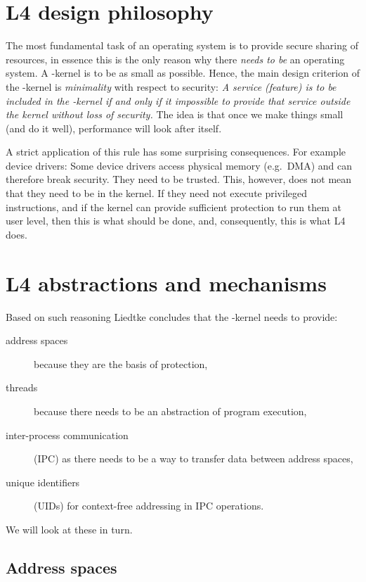 \section{L4 design philosophy}

The most fundamental task of an operating system is to provide secure
sharing of resources, in essence this is the only reason why there
\emph{needs to be} an operating system. A \micro-kernel is to be as small
as possible. Hence, the main design criterion of the \micro-kernel is
\emph{minimality} with respect to security: \emph{A service (feature) is
to be included in the \micro-kernel if and only if it impossible to
provide that service outside the kernel without loss of security.} The
idea is that once we make things small (and do it well), performance
will look after itself.

A strict application of this rule has some surprising consequences. For
example device drivers: Some device drivers access physical memory
(e.g.\ DMA) and can therefore break security. They need to be
trusted. This, however, does not mean that they need to be in the
kernel. If they need not execute privileged instructions, and if the
kernel can provide sufficient protection to run them  at user level,
then this is what should be done, and, consequently, this is what L4
does.



\section{L4 abstractions and mechanisms}

Based on such reasoning Liedtke concludes that the \micro-kernel needs
to provide:
\begin{description}
\item[address spaces] because they are the basis of protection,
\item[threads] because there needs to be an abstraction of program
execution,
\item[inter-process communication] (IPC) as there needs to be a way to
transfer data between address spaces,
\item[unique identifiers] (UIDs) for context-free addressing in IPC operations.
\end{description}
We will look at these in turn.


\subsection{Address spaces}

